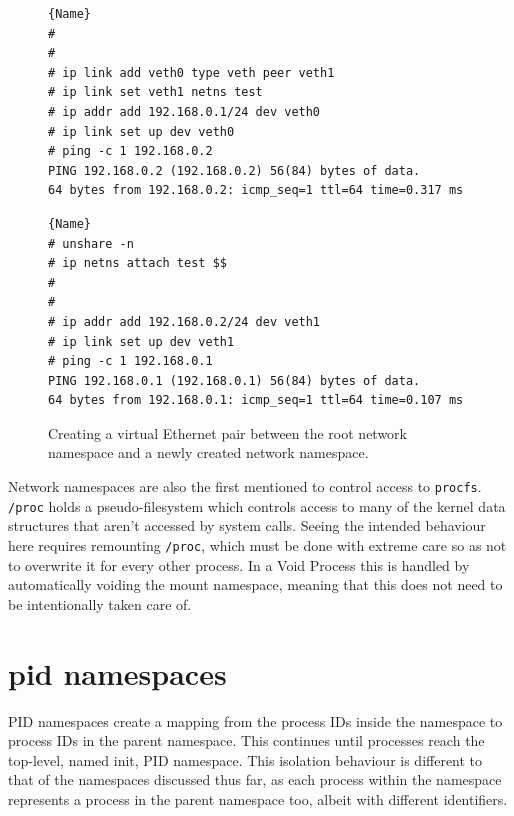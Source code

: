 \documentclass[12pt,a4paper,twoside]{report}
\begin{document}
\begin{figure}
\begin{minipage}{.45\textwidth}

\begin{lstlisting}[frame=tlrb,showlines=true]{Name}
#
#
# ip link add veth0 type veth peer veth1
# ip link set veth1 netns test
# ip addr add 192.168.0.1/24 dev veth0
# ip link set up dev veth0
# ping -c 1 192.168.0.2
PING 192.168.0.2 (192.168.0.2) 56(84) bytes of data.
64 bytes from 192.168.0.2: icmp_seq=1 ttl=64 time=0.317 ms
\end{lstlisting}

\end{minipage}\hfill
\begin{minipage}{.45\textwidth}

\begin{lstlisting}[frame=tlrb]{Name}
# unshare -n
# ip netns attach test $$
#
#
# ip addr add 192.168.0.2/24 dev veth1
# ip link set up dev veth1
# ping -c 1 192.168.0.1
PING 192.168.0.1 (192.168.0.1) 56(84) bytes of data.
64 bytes from 192.168.0.1: icmp_seq=1 ttl=64 time=0.107 ms
\end{lstlisting}

\end{minipage}

\caption{Creating a virtual Ethernet pair between the root network namespace and a newly created network namespace.}
\label{fig:virtual-ethernet}
\end{figure}

Network namespaces are also the first mentioned to control access to \texttt{procfs}. \texttt{/proc} holds a pseudo-filesystem which controls access to many of the kernel data structures that aren't accessed by system calls. Seeing the intended behaviour here requires remounting \texttt{/proc}, which must be done with extreme care so as not to overwrite it for every other process. In a Void Process this is handled by automatically voiding the mount namespace, meaning that this does not need to be intentionally taken care of.


\section{pid namespaces}
\label{sec:voiding-pid}

PID namespaces create a mapping from the process IDs inside the namespace to process IDs in the parent namespace. This continues until processes reach the top-level, named init, PID namespace. This isolation behaviour is different to that of the namespaces discussed thus far, as each process within the namespace represents a process in the parent namespace too, albeit with different identifiers.
\end{document}
